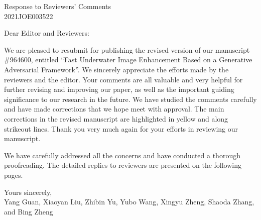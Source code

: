 \documentclass[a4paper,twoside,10pt]{reviewresponse}
\makeatletter
\newcommand{\myAuthors}{{John.~Doe$^{\displaystyle 1}$, ~Foo~B.~Bar$^{\displaystyle 2}$, } \\ {~Peter Sanchez$^{\displaystyle 2}$}}
\newcommand{\myEmail}{john@uco.es}
\newcommand{\myTitle}{Response to Reviewers' Comments}
\newcommand{\myJournal}{2021JOE003522}
\newcommand{\myDept}{{$^{\displaystyle 1}$Department of Computer Science and Numerical Analysis, University of C\'{o}rdoba, C\'{o}rdoba 14074, Spain. \\ \url{http://www.uco.es/ayrna/}}\\
{$^{\displaystyle 2}$School of Computer Science, The University of XXX. }\\}
\makeatother
\begin{document}
\thispagestyle{plain}

\begin{center}
 {\LARGE\myTitle} \vspace{0.5cm} \\
 {\large\myJournal} \vspace{0.5cm} \\
\end{center}


Dear Editor and Reviewers:
\par
\quad\quad We are pleased to resubmit for publishing the revised version of our manuscript $\#$964600, entitled ``Fast Underwater Image Enhancement Based on a Generative Adversarial Framework''. We sincerely appreciate the efforts made by the reviewers and the editor. Your comments are all valuable and very helpful for further revising and improving our paper, as well as the important guiding significance to our research in the future. We have studied the comments carefully and have made corrections that we hope meet with approval. The main corrections in the revised manuscript are highlighted in yellow and along strikeout lines. Thank you very much again for your efforts in reviewing our manuscript.
\par
\quad\quad We have carefully addressed all the concerns and have conducted a thorough proofreading. The detailed replies to reviewers are presented on the following pages.

Yours sincerely,\\
Yang Guan, Xiaoyan Liu, Zhibin Yu, Yubo Wang, Xingyu Zheng, Shaoda Zhang, and Bing Zheng 
\newpage
\end{document}

